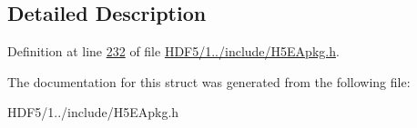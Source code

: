 \subsection{Detailed Description}


Definition at line \hyperlink{_h_d_f5_21_810_81_2include_2_h5_e_apkg_8h_source_l00232}{232} of file \hyperlink{_h_d_f5_21_810_81_2include_2_h5_e_apkg_8h_source}{H\+D\+F5/1../include/\+H5\+E\+Apkg.\+h}.



The documentation for this struct was generated from the following file\+:\begin{DoxyCompactItemize}
\item 
H\+D\+F5/1../include/\+H5\+E\+Apkg.\+h\end{DoxyCompactItemize}

